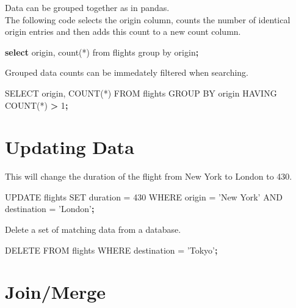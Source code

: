 \documentclass[]{book}
\newenvironment{Shaded}{\begin{snugshade}}{\end{snugshade}}
\newcommand{\KeywordTok}[1]{\textcolor[rgb]{0.13,0.29,0.53}{\textbf{#1}}}
\newcommand{\StringTok}[1]{\textcolor[rgb]{0.31,0.60,0.02}{#1}}
\newcommand{\OperatorTok}[1]{\textcolor[rgb]{0.81,0.36,0.00}{\textbf{#1}}}
\newcommand{\ExtensionTok}[1]{#1}
\newcommand{\NormalTok}[1]{#1}
\begin{document}
Data can be grouped together as in pandas.\\
The following code selects the origin column, counts the number of
identical origin entries and then adds this count to a new count column.

\begin{Shaded}
\begin{Highlighting}[]
\KeywordTok{select} \ExtensionTok{origin}\NormalTok{, count(*) }\ExtensionTok{from}\NormalTok{ flights group by origin}\KeywordTok{;}
\end{Highlighting}
\end{Shaded}

Grouped data counts can be immedately filtered when searching.

\begin{Shaded}
\begin{Highlighting}[]
\ExtensionTok{SELECT}\NormalTok{ origin, COUNT(*) }\ExtensionTok{FROM}\NormalTok{ flights GROUP BY origin HAVING COUNT(*) }\OperatorTok{>} \ExtensionTok{1}\KeywordTok{;}
\end{Highlighting}
\end{Shaded}

\section{Updating Data}\label{updating-data}

This will change the duration of the flight from New York to London to
430.

\begin{Shaded}
\begin{Highlighting}[]
\ExtensionTok{UPDATE}\NormalTok{ flights}
\ExtensionTok{SET}\NormalTok{ duration = 430}
\ExtensionTok{WHERE}\NormalTok{ origin = }\StringTok{'New York'}
\ExtensionTok{AND}\NormalTok{ destination = }\StringTok{'London'}\KeywordTok{;}
\end{Highlighting}
\end{Shaded}

Delete a set of matching data from a database.

\begin{Shaded}
\begin{Highlighting}[]
\ExtensionTok{DELETE}\NormalTok{ FROM flights}
\ExtensionTok{WHERE}\NormalTok{ destination = }\StringTok{'Tokyo'}\KeywordTok{;}
\end{Highlighting}
\end{Shaded}

\section{Join/Merge}\label{joinmerge}
\end{document}
